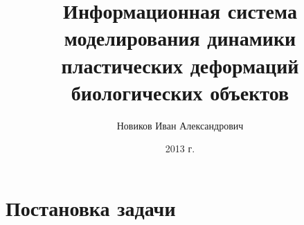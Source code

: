 \documentclass[usenames,dvipsnames,pdftex,unicode,hidelinks]{beamer}
\title[Система моделирования пластических деформаций биологических объектов]{Информационная система моделирования динамики пластических деформаций биологических объектов}
\author[Иван Новиков]{Новиков Иван Александрович}
\institute{Н1: Информационные технологии}
\date{ 2013 г. }
\begin{document}
  {
    \begin{frame}[plain]
      \titlepage
    \end{frame}
  }

  \section{Постановка задачи}
\end{document}
